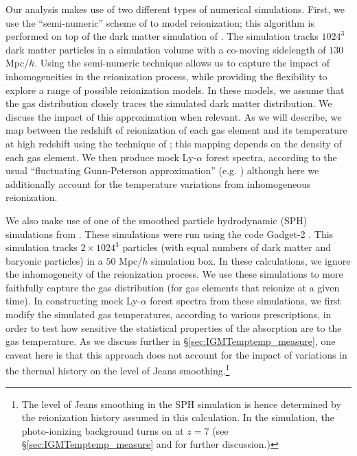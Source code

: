 Our analysis makes use of two different types of numerical simulations. First, we use the ``semi-numeric'' scheme of
\citet{Zahn:2006sg} to model reionization; this algorithm is performed 
on top of the dark matter simulation of \citet{McQuinn:2007dy}. The \citet{McQuinn:2007dy} simulation
tracks $1024^3$ dark matter particles in a simulation volume with a co-moving sidelength of $130$ Mpc/$h$. 
Using the semi-numeric technique allows
us to capture the impact of inhomogeneities in the reionization process, while providing the flexibility to explore a range
of possible reionization models. In these models, we assume that the gas distribution closely traces the simulated dark
matter distribution. We discuss the impact of this approximation when relevant.
As we will describe,
we map between the redshift of reionization of each gas element and its temperature at high redshift using the technique
of \citet{Hui:1997dp}; this mapping depends on the density of each gas element. We then produce mock Ly-$\alpha$ forest
spectra, according to the usual ``fluctuating Gunn-Peterson approximation'' (e.g. \citealt{MiraldaEscude:1995bu,Croft:2000hs}) although here 
we additionally account for the temperature
variations from inhomogeneous reionization.

We also make use of one of the smoothed particle hydrodynamic (SPH) simulations from \citet{Lidz:2009ca}. These simulations 
were run using the code Gadget-2 \citep{2005MNRAS.364.1105S}. This simulation tracks $2\times 1024^3$ particles
(with equal numbers of dark matter and baryonic particles) in a $50$ Mpc/$h$ simulation box. In these calculations, we ignore
the inhomogeneity of the reionization process. We use these simulations to more faithfully capture the gas distribution (for
gas elements that reionize at a given time). In constructing mock Ly-$\alpha$ forest spectra from these simulations, we first
modify the simulated gas temperatures, according to various prescriptions, in order to test how sensitive the statistical properties of the
absorption are to the gas temperature. As we discuss further in \S \ref{sec:IGMTemptemp_measure}, one caveat here is that 
this approach does not
account for the impact of variations in the thermal history on the level of Jeans smoothing.\footnote{The level of Jeans
smoothing in the SPH simulation is hence determined by the reionization history assumed in this calculation. In the
simulation, the \citet{FaucherGiguere:2009rh} photo-ionizing background turns on at $z=7$ (see \S \ref{sec:IGMTemptemp_measure}
and \citealt{Lidz:2009ca} for further discussion.)}


